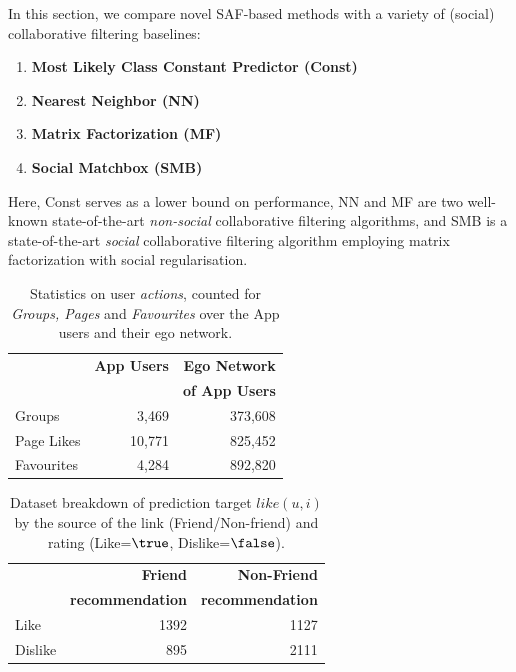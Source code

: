 In this section, we compare novel SAF-based methods with a
variety of (social) collaborative filtering baselines:
\begin{enumerate}
\item {\bf Most Likely Class Constant Predictor (Const)}
\item {\bf Nearest Neighbor (NN)}~\cite{bellkor}
\item {\bf Matrix Factorization (MF)}~\cite{pmf}
\item {\bf Social Matchbox (SMB)}~\cite{Noel2012NOF}
\end{enumerate}
Here, Const serves as a lower bound on performance, NN and MF are two
well-known state-of-the-art \emph{non-social} collaborative filtering
algorithms, and SMB is a state-of-the-art \emph{social} collaborative
filtering algorithm employing matrix factorization with social
regularisation.


\begin{table}[t!]
\centering
\begin{tabular}{|>{\small}l|>{\small}r|>{\small}r|}
\hline
& \textbf{App Users} & \textbf{Ego Network} \\
& & \textbf{of App Users} \\
\hline
Groups & 3,469 & 373,608 \\
\hline
Page Likes & 10,771 & 825,452 \\
\hline
Favourites & 4,284 & 892,820\\
\hline
\end{tabular}
\caption{Statistics on user {\em actions}, counted for {\em Groups, Pages} and {\em Favourites} over the App users and their ego network.}
\label{tab:interests}
\end{table}

\begin{table}[t!]
\centering
\begin{tabular}{|>{\small}l|>{\small}r|>{\small}r|}\hline
&\textbf{Friend}  & \textbf{Non-Friend} \\
&\textbf{recommendation}  & \textbf{recommendation} \\
\hline
Like& 1392 & 1127 \\
\hline
Dislike& 895 & 2111\\
\hline
\end{tabular}
\caption{Dataset breakdown of prediction target $like(u,i)$ by the source of the link (Friend/Non-friend) and rating (Like=$\true$, Dislike=$\false$).}
\label{tab:likeinfo}
\end{table}


